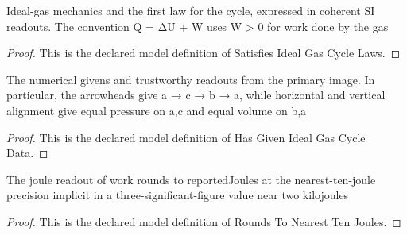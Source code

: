 \begin{definition}
  \label{def:physics:phyx-mini-0342:phyxminiproblems-problemphyxmini0342-satisfiesidealgascyclelaws}
  Ideal-gas mechanics and the first law for the cycle, expressed in coherent SI readouts. The convention Q = ΔU + W uses W > 0 for work done by the gas
\end{definition}
\begin{proof}
  This is the declared model definition of Satisfies Ideal Gas Cycle Laws.
\end{proof}
\begin{definition}
  \label{def:physics:phyx-mini-0342:phyxminiproblems-problemphyxmini0342-hasgivenidealgascycledata}
  The numerical givens and trustworthy readouts from the primary image. In particular, the arrowheads give a → c → b → a, while horizontal and vertical alignment give equal pressure on a,c and equal volume on b,a
\end{definition}
\begin{proof}
  This is the declared model definition of Has Given Ideal Gas Cycle Data.
\end{proof}
\begin{definition}
  \label{def:physics:phyx-mini-0342:phyxminiproblems-problemphyxmini0342-roundstonearesttenjoules}
  The joule readout of work rounds to reportedJoules at the nearest-ten-joule precision implicit in a three-significant-figure value near two kilojoules
\end{definition}
\begin{proof}
  This is the declared model definition of Rounds To Nearest Ten Joules.
\end{proof}

